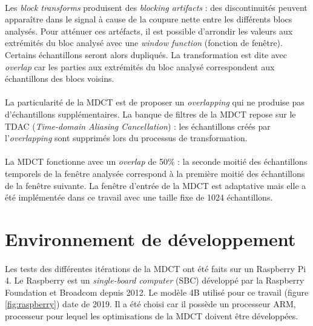 \documentclass{article}
\begin{document}
    \paragraph{}
    Les \emph{block transforms} produisent des \emph{blocking artifacts} : des discontinuités peuvent apparaître dans le signal à cause de la coupure nette entre les différents blocs analysés. Pour atténuer ces artéfacts, il est possible d'arrondir les valeurs aux extrémités du bloc analysé avec une \emph{window function} (fonction de fenêtre). Certains échantillons seront alors dupliqués. La transformation est dite avec \emph{overlap} car les parties aux extrémités du bloc analysé correspondent aux échantillons des blocs voisins\cite{2014-edler}.

    \paragraph{}
    La particularité de la MDCT est de proposer un \emph{overlapping} qui ne produise pas d'échantillons supplémentaires. La banque de filtres de la MDCT repose sur le TDAC (\emph{Time-domain Aliasing Cancellation}) : les échantillons créés par l'\emph{overlapping} sont supprimés lors du processus de transformation\cite{1987-princen-bradley}.

    \paragraph{}
    La MDCT fonctionne avec un \emph{overlap} de 50\% : la seconde moitié des échantillons temporels de la fenêtre analysée correspond à la première moitié des échantillons de la fenêtre suivante. La fenêtre d'entrée de la MDCT est adaptative mais elle a été implémentée dans ce travail avec une taille fixe de 1024 échantillons.



    \newpage
    \section{Environnement de développement}

    \paragraph{}
    Les tests des différentes itérations de la MDCT ont été faits sur un Raspberry Pi 4. Le Raspberry est un \emph{single-board computer} (SBC) développé par la Raspberry Foundation et Broadcom depuis 2012. Le modèle 4B utilisé pour ce travail (figure \ref{fig:raspberry}) date de 2019. Il a été choisi car il possède un processeur ARM, processeur pour lequel les optimisations de la MDCT doivent être développées\cite{raspberry-doc}.
\end{document}
